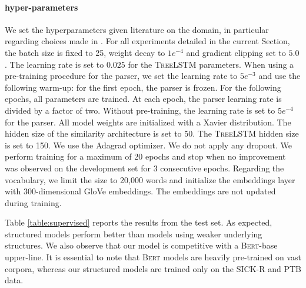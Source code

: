 \paragraph{hyper-parameters} We set the hyperparameters given literature on the domain, in particular regarding choices made in \textcite{tai_15}. For all experiments detailed in the current Section, the batch size is fixed to 25, weight decay to $1e^{-4}$ and gradient clipping set to $5.0$. The learning rate is set to $0.025$ for the \textsc{TreeLSTM} parameters. When using a pre-training procedure for the parser, we set the learning rate to $5e^{-3}$ and use the following warm-up: for the first epoch, the parser is frozen. For the following epochs, all parameters are trained. At each epoch, the parser learning rate is divided by a factor of two. Without pre-training, the learning rate is set to $5e^{-4}$ for the parser. All model weights are initialized with a Xavier distribution. The hidden size of the similarity architecture is set to 50. The \textsc{TreeLSTM} hidden size is set to 150. We use the Adagrad optimizer. We do not apply any dropout. We perform training for a maximum of 20 epochs and stop when no improvement was observed on the development set for 3 consecutive epochs.
Regarding the vocabulary, we limit the size to 20,000 words and initialize the embeddings layer with 300-dimensional GloVe embeddings. The embeddings are not updated during training. 



Table \ref{table:supervised} reports the results from the test set. As expected, structured models perform better than models using weaker underlying structures. We also observe that our model is competitive with a \textsc{Bert}-base upper-line. It is essential to note that \textsc{Bert} models are heavily pre-trained on vast corpora, whereas our structured models are trained only on the SICK-R and PTB data. 

